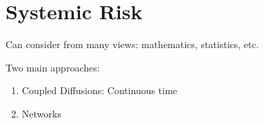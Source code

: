 \documentclass[twocolumn,openany]{book}
\begin{document}

\section{Systemic Risk}
Can consider from many views: mathematics, statistics, etc.

Two main approaches:
\begin{enumerate}
	\item Coupled Diffusions: Continuous time
	\item Networks
\end{enumerate}
\end{document}

